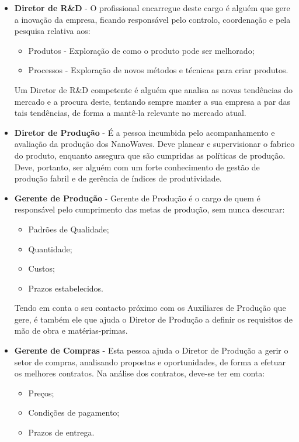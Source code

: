 \documentclass[a4paper]{article}
\begin{document}
\begin{itemize}
    \item \textbf{Diretor de R\&D} - O profissional encarregue deste cargo é alguém que gere a inovação da empresa, ficando responsável pelo controlo, coordenação e pela pesquisa relativa aos:
    \begin{itemize}
        \item Produtos - Exploração de como o produto pode ser melhorado;
        \item Processos - Exploração de novos métodos e técnicas para criar produtos.
    \end{itemize}
    Um Diretor de R\&D competente é alguém que analisa as novas tendências do mercado e a procura deste, tentando sempre manter a sua empresa a par das tais tendências, de forma a mantê-la relevante no mercado atual.
    \item \textbf{Diretor de Produção} - É a pessoa incumbida pelo acompanhamento e avaliação da produção dos NanoWaves. Deve planear e supervisionar o fabrico do produto, enquanto assegura que são cumpridas as políticas de produção. Deve, portanto, ser alguém com um forte conhecimento de gestão de produção fabril e de gerência de índices de produtividade.
    \item \textbf{Gerente de Produção} - Gerente de Produção é o cargo de quem é responsável pelo cumprimento das metas de produção, sem nunca descurar:
    \begin{itemize}
        \item Padrões de Qualidade;
        \item Quantidade;
        \item Custos;
        \item Prazos estabelecidos.
    \end{itemize}
    Tendo em conta o seu contacto próximo com os Auxiliares de Produção que gere, é também ele que ajuda o Diretor de Produção a definir os requisitos de mão de obra e matérias-primas.
    \item \textbf{Gerente de Compras} - Esta pessoa ajuda o Diretor de Produção a gerir o setor de compras, analisando propostas e oportunidades, de forma a efetuar os melhores contratos. Na análise dos contratos, deve-se ter em conta:
    \begin{itemize}
        \item Preços;
        \item Condições de pagamento;
        \item Prazos de entrega.
    \end{itemize}
\end{itemize}
\end{document}
